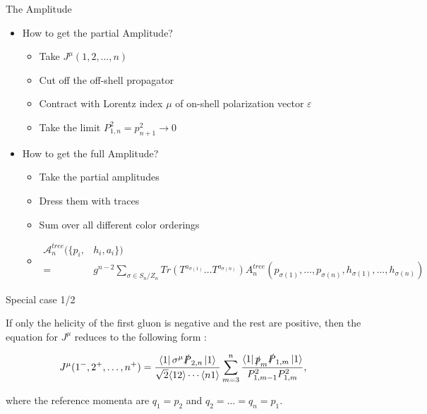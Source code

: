 \documentclass[10pt]{beamer}
\begin{document}
\begin{frame}{The Amplitude}

\begin{itemize}[<+->]
    \item[] How to get the \alert{partial} Amplitude? \cite{lsz55}
    \begin{itemize}[<+->]
        \item Take $J^{\mu}(1,2, \dots ,n)$
        \item Cut off the off-shell propagator
        \item Contract with Lorentz index $\mu$ of on-shell polarization vector $\varepsilon$
        \item Take the limit $P_{1,n}^2 = p_{n+1}^2 \to 0$
    \end{itemize}
    \item[] How to get the \alert{full} Amplitude?
    \begin{itemize}[<+->]
        \item Take the partial amplitudes
        \item Dress them with traces
        \item Sum over all different color orderings
        \item[] {\scriptsize
        \begin{equation*}
            \begin{aligned}
                \mathcal{A}_n^{tree}(\{p_i, &h_i, a_i\}) \\
                = &g^{n-2} \sum_{\sigma \in S_n/Z_n} Tr(T^{a_{\sigma(1)}} \dots T^{a_{\sigma(n)}}) A_n^{tree}(p_{\sigma(1)}, \dots, p_{\sigma(n)}, h_{\sigma(1)}, \dots, h_{\sigma(n)})
            \end{aligned}
        \end{equation*}
        }
    \end{itemize}
\end{itemize}

\end{frame}

\begin{frame}{Special case 1/2}

If only the helicity of the first gluon is negative and the rest are positive, then the equation for $J^{\mu}$ reduces to the following form \cite{bg88recursive}:

\begin{align}
    J^{\mu}(1^{-}, 2^{+}, \dots , n^{+}) = \frac{ \bra{1} \sigma^{\mu} \slashed{P}_{2,n} \ket{1} }{ \sqrt{2} \langle 12 \rangle \cdots \langle n1 \rangle } \sum_{m=3}^{n} \frac{ \bra{1} \slashed{p}_m \slashed{P}_{1,m} \ket{1} }{ P_{1,m-1}^2 P_{1,m}^2 },
\end{align}

where the reference momenta are $q_1 = p_2$ and $q_2 = \dots = q_n = p_1$.

\end{frame}
\end{document}
